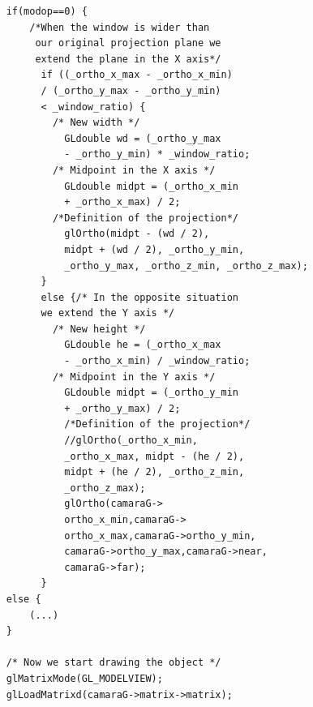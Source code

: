 \documentclass[12pt,a4paper]{article}
\begin{document}
\begin{enumerate}
\begin{enumerate}
\begin{lstlisting}
    if(modop==0) {
        /*When the window is wider than
         our original projection plane we
         extend the plane in the X axis*/
          if ((_ortho_x_max - _ortho_x_min)
          / (_ortho_y_max - _ortho_y_min)
          < _window_ratio) {
            /* New width */
              GLdouble wd = (_ortho_y_max
              - _ortho_y_min) * _window_ratio;
            /* Midpoint in the X axis */
              GLdouble midpt = (_ortho_x_min
              + _ortho_x_max) / 2;
            /*Definition of the projection*/
              glOrtho(midpt - (wd / 2),
              midpt + (wd / 2), _ortho_y_min,
              _ortho_y_max, _ortho_z_min, _ortho_z_max);
          } 
          else {/* In the opposite situation
          we extend the Y axis */
            /* New height */
              GLdouble he = (_ortho_x_max
              - _ortho_x_min) / _window_ratio;
            /* Midpoint in the Y axis */
              GLdouble midpt = (_ortho_y_min
              + _ortho_y_max) / 2;
              /*Definition of the projection*/
              //glOrtho(_ortho_x_min,
              _ortho_x_max, midpt - (he / 2),
              midpt + (he / 2), _ortho_z_min,
              _ortho_z_max);
              glOrtho(camaraG->
              ortho_x_min,camaraG->
              ortho_x_max,camaraG->ortho_y_min,
              camaraG->ortho_y_max,camaraG->near,
              camaraG->far);
          }
    else {
		(...)
    }

    /* Now we start drawing the object */
    glMatrixMode(GL_MODELVIEW);
    glLoadMatrixd(camaraG->matrix->matrix);
\end{lstlisting}



\end{enumerate}
\end{enumerate}
\end{document}
